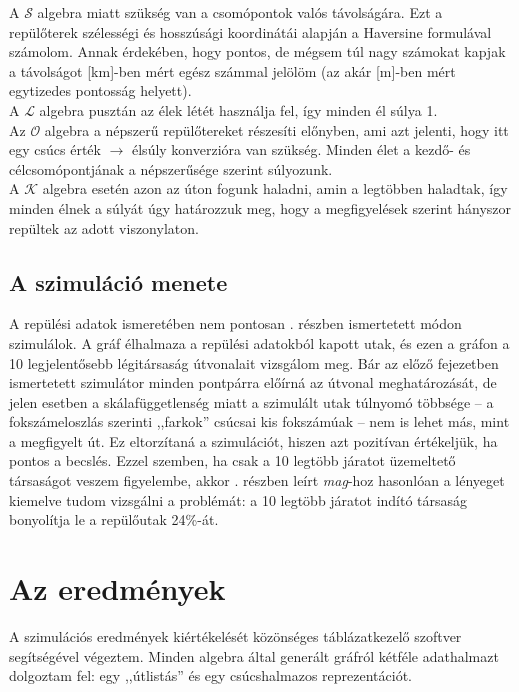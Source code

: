       A $\mathcal{S}$ algebra miatt szükség van a csomópontok valós távolságára. Ezt a repülőterek szélességi és hosszúsági koordinátái alapján a Haversine formulával számolom. Annak érdekében, hogy pontos, de mégsem túl nagy számokat kapjak a távolságot [km]-ben mért egész számmal jelölöm (az akár [m]-ben mért egytizedes pontosság helyett).\\
      A $\mathcal{L}$ algebra pusztán az élek létét használja fel, így minden él súlya 1.\\
      Az $\mathcal{O}$ algebra a népszerű repülőtereket részesíti előnyben, ami azt jelenti, hogy itt egy csúcs érték $\rightarrow$ élsúly konverzióra van szükség. Minden élet a kezdő- és célcsomópontjának a népszerűsége szerint súlyozunk.\\
      A $\mathcal{K}$ algebra esetén azon az úton fogunk haladni, amin a legtöbben haladtak, így minden élnek a súlyát úgy határozzuk meg, hogy a megfigyelések szerint hányszor repültek az adott viszonylaton.

    \subsection{A szimuláció menete}
    A repülési adatok ismeretében nem pontosan . részben ismertetett módon szimulálok. A gráf élhalmaza a repülési adatokból kapott utak, és ezen a gráfon a 10 legjelentősebb légitársaság útvonalait vizsgálom meg. Bár az előző fejezetben ismertetett szimulátor minden pontpárra előírná az útvonal meghatározását, de jelen esetben a skálafüggetlenség miatt a szimulált utak túlnyomó többsége -- a fokszámeloszlás szerinti ,,farkok'' csúcsai kis fokszámúak -- nem is lehet más, mint a megfigyelt út. Ez eltorzítaná a szimulációt, hiszen azt pozitívan értékeljük, ha pontos a becslés. Ezzel szemben, ha csak a 10 legtöbb járatot üzemeltető társaságot veszem figyelembe, akkor . részben leírt \textit{mag}-hoz hasonlóan a lényeget kiemelve tudom vizsgálni a problémát: a 10 legtöbb járatot indító társaság bonyolítja le a repülőutak 24\%-át.

  \section{Az eredmények}
  A szimulációs eredmények kiértékelését közönséges táblázatkezelő szoftver segítségével végeztem. Minden algebra által generált gráfról kétféle adathalmazt dolgoztam fel: egy ,,útlistás'' és egy csúcshalmazos reprezentációt.\\

